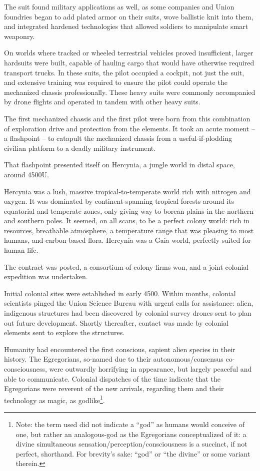 The suit found military applications as well, as some companies and Union foundries began to
add plated armor on their suits, wove ballistic knit into them, and integrated hardened
technologies that allowed soldiers to manipulate smart weaponry.

On worlds where tracked or wheeled terrestrial vehicles proved insufficient, larger hardsuits were
built, capable of hauling cargo that would have otherwise required transport trucks. In these
suits, the pilot occupied a cockpit, not just the suit, and extensive training was required to ensure
the pilot could operate the mechanized chassis professionally. These heavy suits were commonly
accompanied by drone flights and operated in tandem with other heavy suits.

The first mechanized chassis and the first pilot were born from this combination of exploration
drive and protection from the elements. It took an acute moment -- a flashpoint -- to catapult the
mechanized chassis from a useful-if-plodding civilian platform to a deadly military instrument.

That flashpoint presented itself on Hercynia, a jungle world in distal space, around 4500U.

Hercynia was a lush, massive tropical-to-temperate world rich with nitrogen and oxygen. It was
dominated by continent-spanning tropical forests around its equatorial and temperate zones,
only giving way to borean plains in the northern and southern poles. It seemed, on all scans, to
be a perfect colony world: rich in resources, breathable atmosphere, a temperature range that
was pleasing to most humans, and carbon-based flora. Hercynia was a Gaia world, perfectly
suited for human life.

The contract was posted, a consortium of colony firms won, and a joint colonial expedition was
undertaken.

Initial colonial sites were established in early 4500. Within months, colonial scientists pinged the
Union Science Bureau with urgent calls for assistance: alien, indigenous structures had been
discovered by colonial survey drones sent to plan out future development. Shortly thereafter,
contact was made by colonial elements sent to explore the structures.

Humanity had encountered the first conscious, sapient alien species in their history. The
Egregorians, so-named due to their autonomous/consensus co-consciousness, were outwardly
horrifying in appearance, but largely peaceful and able to communicate. Colonial dispatches of
the time indicate that the Egregorians were reverent of the new arrivals, regarding them and their
technology as magic, as godlike\footnote{Note: the term used did not indicate a “god” as humans would conceive of one, but rather an analogous-god as the
Egregorians conceptualized of it: a divine simultaneous sensation/perception/consciousness is a succinct, if not
perfect, shorthand. For brevity’s sake: “god” or “the divine” or some variant therein.}.

